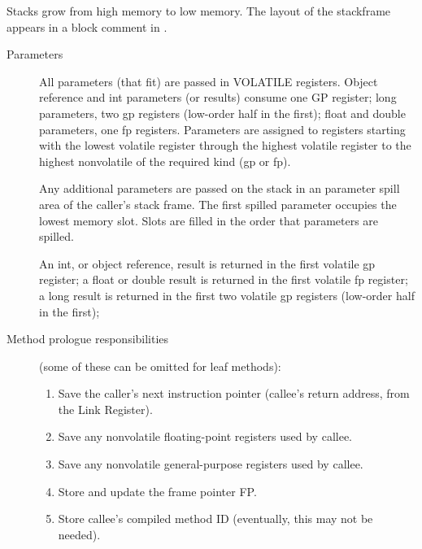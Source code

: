 
Stacks grow from high memory to low memory.
The layout of the stackframe appears in a block comment in
{\PPCStackframeLayoutURL}.


\begin{description}
\item[Parameters]

    All parameters (that fit) are passed in VOLATILE registers.  Object
    reference and int parameters (or results) consume one GP register; long
    parameters, two gp registers (low-order half in the first);  float and
    double parameters, one fp registers.  Parameters are 
    assigned to registers
    starting with the lowest volatile register through the highest volatile
    register to the highest nonvolatile of the required kind (gp or fp).

    Any additional parameters are passed on the stack in an parameter spill
    area of the caller's stack frame.  The first spilled parameter occupies
    the lowest memory slot.  Slots are filled in the order that parameters
    are spilled.

    An int, or object reference, result is returned in the first volatile
    gp register; a float or double result is returned in the first volatile
    fp register; a long result is returned in the first two volatile gp
    registers (low-order half in the first);

\item [Method prologue responsibilities] (some of these can be omitted for leaf
  methods):

\begin{enumerate}
\item Save the caller's next instruction pointer (callee's return address,
       from the Link Register).

\item Save any nonvolatile floating-point registers used by callee.

\item Save any nonvolatile general-purpose registers used by callee.

\item Store and update the frame pointer FP.

\item Store callee's compiled method ID (eventually, this may not be needed).


\end{enumerate}
\end{description}
